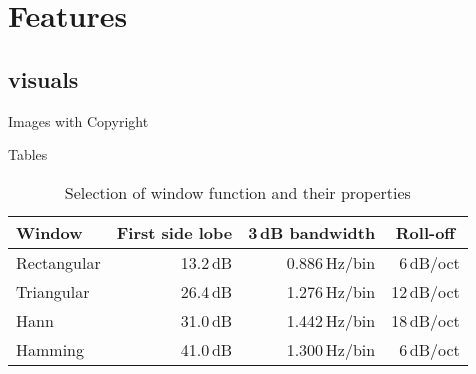 \documentclass[compress]{beamer}
\begin{document}
%
%
\section{Features}

\subsection{visuals}


\begin{frame}{Images with Copyright}
	\begin{figure}
		\centering
	\end{figure}
\end{frame}


\begin{frame}{Tables}
\begin{table}[]
	\caption{Selection of window function and their properties}
	\begin{tabular}[]{lrrr}
		\toprule
		\textbf{Window}			& \multicolumn{1}{c}{\textbf{First side lobe}}	
		                    & \multicolumn{1}{c}{\textbf{3\,dB bandwidth}}
		                    & \multicolumn{1}{c}{\textbf{Roll-off}} \\
		\midrule
		Rectangular				& 13.2\,dB	& 0.886\,Hz/bin	& 6\,dB/oct		\\[0.25em]
		Triangular				& 26.4\,dB	& 1.276\,Hz/bin	& 12\,dB/oct	\\[0.25em]
		Hann					& 31.0\,dB	& 1.442\,Hz/bin	& 18\,dB/oct	\\[0.25em]
		Hamming					& 41.0\,dB	& 1.300\,Hz/bin	& 6\,dB/oct		\\
		\bottomrule
	\end{tabular}
	\label{tab:WindowFunctions}
\end{table}
\end{frame}

\end{document}
